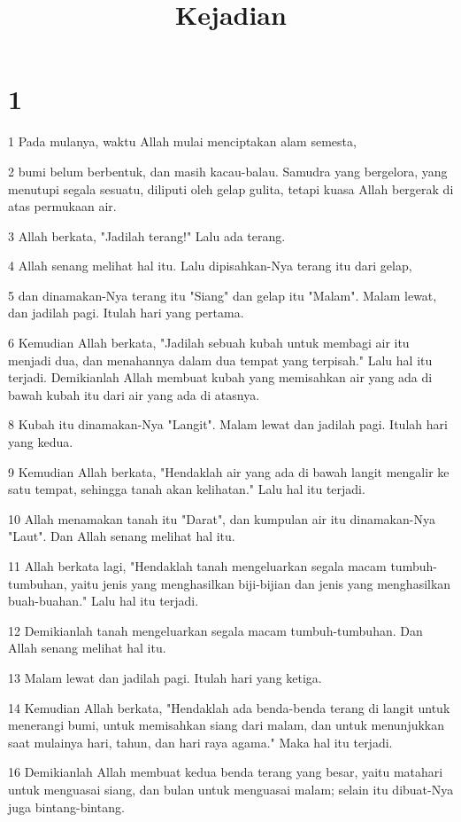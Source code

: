 

\title{Kejadian}


\chapter{1}

\par 1 Pada mulanya, waktu Allah mulai menciptakan alam semesta,
\par 2 bumi belum berbentuk, dan masih kacau-balau. Samudra yang bergelora, yang menutupi segala sesuatu, diliputi oleh gelap gulita, tetapi kuasa Allah bergerak di atas permukaan air.
\par 3 Allah berkata, "Jadilah terang!" Lalu ada terang.
\par 4 Allah senang melihat hal itu. Lalu dipisahkan-Nya terang itu dari gelap,
\par 5 dan dinamakan-Nya terang itu "Siang" dan gelap itu "Malam". Malam lewat, dan jadilah pagi. Itulah hari yang pertama.
\par 6 Kemudian Allah berkata, "Jadilah sebuah kubah untuk membagi air itu menjadi dua, dan menahannya dalam dua tempat yang terpisah." Lalu hal itu terjadi. Demikianlah Allah membuat kubah yang memisahkan air yang ada di bawah kubah itu dari air yang ada di atasnya.
\par 8 Kubah itu dinamakan-Nya "Langit". Malam lewat dan jadilah pagi. Itulah hari yang kedua.
\par 9 Kemudian Allah berkata, "Hendaklah air yang ada di bawah langit mengalir ke satu tempat, sehingga tanah akan kelihatan." Lalu hal itu terjadi.
\par 10 Allah menamakan tanah itu "Darat", dan kumpulan air itu dinamakan-Nya "Laut". Dan Allah senang melihat hal itu.
\par 11 Allah berkata lagi, "Hendaklah tanah mengeluarkan segala macam tumbuh-tumbuhan, yaitu jenis yang menghasilkan biji-bijian dan jenis yang menghasilkan buah-buahan." Lalu hal itu terjadi.
\par 12 Demikianlah tanah mengeluarkan segala macam tumbuh-tumbuhan. Dan Allah senang melihat hal itu.
\par 13 Malam lewat dan jadilah pagi. Itulah hari yang ketiga.
\par 14 Kemudian Allah berkata, "Hendaklah ada benda-benda terang di langit untuk menerangi bumi, untuk memisahkan siang dari malam, dan untuk menunjukkan saat mulainya hari, tahun, dan hari raya agama." Maka hal itu terjadi.
\par 16 Demikianlah Allah membuat kedua benda terang yang besar, yaitu matahari untuk menguasai siang, dan bulan untuk menguasai malam; selain itu dibuat-Nya juga bintang-bintang.
